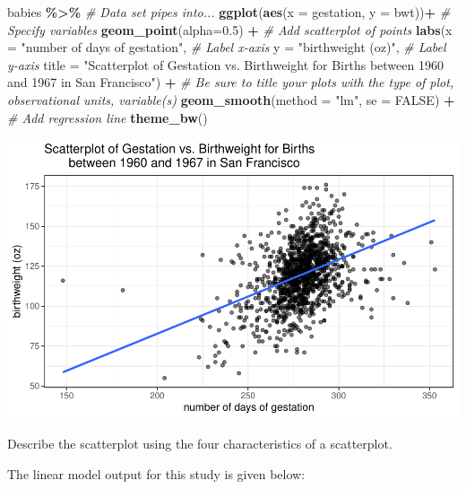 \documentclass[
]{report}
\newenvironment{Shaded}{\begin{snugshade}}{\end{snugshade}}
\newcommand{\AttributeTok}[1]{\textcolor[rgb]{0.13,0.29,0.53}{#1}}
\newcommand{\CommentTok}[1]{\textcolor[rgb]{0.56,0.35,0.01}{\textit{#1}}}
\newcommand{\ConstantTok}[1]{\textcolor[rgb]{0.56,0.35,0.01}{#1}}
\newcommand{\FloatTok}[1]{\textcolor[rgb]{0.00,0.00,0.81}{#1}}
\newcommand{\FunctionTok}[1]{\textcolor[rgb]{0.13,0.29,0.53}{\textbf{#1}}}
\newcommand{\NormalTok}[1]{#1}
\newcommand{\SpecialCharTok}[1]{\textcolor[rgb]{0.81,0.36,0.00}{\textbf{#1}}}
\newcommand{\StringTok}[1]{\textcolor[rgb]{0.31,0.60,0.02}{#1}}
\begin{document}
\begin{Shaded}
\begin{Highlighting}[]
\NormalTok{babies }\SpecialCharTok{\%\textgreater{}\%} \CommentTok{\# Data set pipes into...}
\FunctionTok{ggplot}\NormalTok{(}\FunctionTok{aes}\NormalTok{(}\AttributeTok{x =}\NormalTok{ gestation, }\AttributeTok{y =}\NormalTok{ bwt))}\SpecialCharTok{+}  \CommentTok{\# Specify variables}
  \FunctionTok{geom\_point}\NormalTok{(}\AttributeTok{alpha=}\FloatTok{0.5}\NormalTok{) }\SpecialCharTok{+}  \CommentTok{\# Add scatterplot of points}
  \FunctionTok{labs}\NormalTok{(}\AttributeTok{x =} \StringTok{"number of days of gestation"}\NormalTok{,  }\CommentTok{\# Label x{-}axis}
       \AttributeTok{y =} \StringTok{"birthweight (oz)"}\NormalTok{,  }\CommentTok{\# Label y{-}axis}
       \AttributeTok{title =} \StringTok{"Scatterplot of Gestation vs. Birthweight for Births}
\StringTok{       between 1960 and 1967 in San Francisco"}\NormalTok{) }\SpecialCharTok{+} 
    \CommentTok{\# Be sure to title your plots with the type of plot, observational units, variable(s)}
  \FunctionTok{geom\_smooth}\NormalTok{(}\AttributeTok{method =} \StringTok{"lm"}\NormalTok{, }\AttributeTok{se =} \ConstantTok{FALSE}\NormalTok{) }\SpecialCharTok{+} \CommentTok{\# Add regression line}
    \FunctionTok{theme\_bw}\NormalTok{()}
\end{Highlighting}
\end{Shaded}

\begin{center}\includegraphics[width=0.8\linewidth]{04-LN04-two-quantitativeEDA_files/figure-latex/unnamed-chunk-2-1} \end{center}

Describe the scatterplot using the four characteristics of a scatterplot.

\vspace{1in}

The linear model output for this study is given below:
\end{document}
